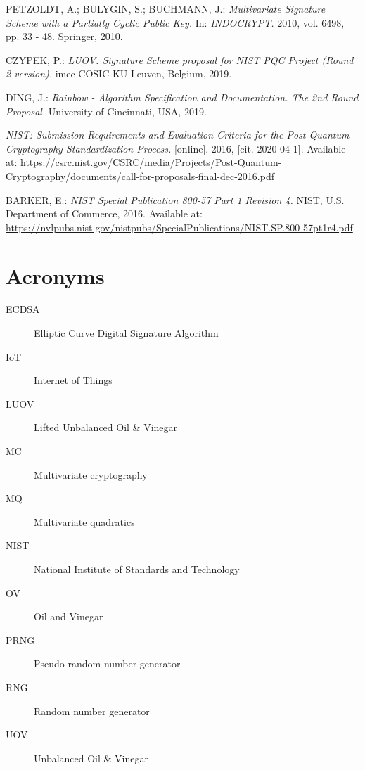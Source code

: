 \documentclass[thesis=M,english]{FITthesis}[2019/12/23]
\begin{document}
\begin{thebibliography}{9}
PETZOLDT, A.; BULYGIN, S.; BUCHMANN, J.: \textit{Multivariate
Signature Scheme with a Partially Cyclic Public Key.} In: \textit{INDOCRYPT.} 2010, vol. 6498, pp. 33 - 48. Springer, 2010.

CZYPEK, P.: \textit{LUOV. Signature Scheme proposal for NIST PQC Project (Round 2 version).} imec-COSIC KU Leuven, Belgium, 2019.

DING, J.: \textit{Rainbow - Algorithm Specification and Documentation. The 2nd Round Proposal.} University of Cincinnati, USA, 2019.

\textit{NIST: Submission Requirements and Evaluation Criteria for the Post-Quantum Cryptography Standardization Process.} [online]. 2016, [cit. 2020-04-1]. Available at: \url{https://csrc.nist.gov/CSRC/media/Projects/Post-Quantum-Cryptography/documents/call-for-proposals-final-dec-2016.pdf}

BARKER, E.: \textit{NIST Special Publication 800-57 Part 1 Revision 4.} NIST, U.S. Department of Commerce, 2016. Available at: \url{https://nvlpubs.nist.gov/nistpubs/SpecialPublications/NIST.SP.800-57pt1r4.pdf}

\end{thebibliography}
\appendix

\chapter{Acronyms}
\begin{description}
\item[ECDSA] Elliptic Curve Digital Signature Algorithm
\item[IoT] Internet of Things
\item[LUOV] Lifted Unbalanced Oil \& Vinegar
\item[MC] Multivariate cryptography
\item[MQ] Multivariate quadratics
\item[NIST] National Institute of Standards and Technology
\item[OV] Oil and Vinegar
\item[PRNG] Pseudo-random number generator
\item[RNG] Random number generator
\item[UOV] Unbalanced Oil \& Vinegar
\end{description}
\end{document}
